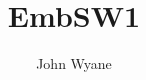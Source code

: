 \documentclass[titlepage=true]{scrartcl}
\title{EmbSW1}
\author{John Wyane}
\begin{document}
\begin{titlepage}
   \thispagestyle{empty}
   \maketitle
\end{titlepage}

\tableofcontents%

%
\end{document}
